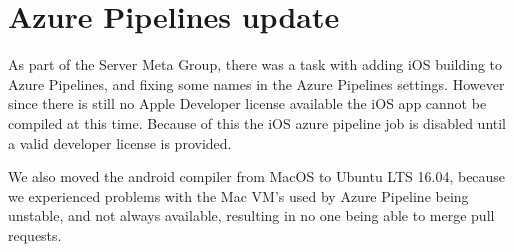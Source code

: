 \section{Azure Pipelines update}
As part of the Server Meta Group, there was a task with adding iOS building to Azure Pipelines, and fixing some names in the Azure Pipelines settings. However since there is still no Apple Developer license available the iOS app cannot be compiled at this time. Because of this the iOS azure pipeline job is disabled until a valid developer license is provided. 

We also moved the android compiler from MacOS to Ubuntu LTS 16.04, because we experienced problems with the Mac VM's used by Azure Pipeline being unstable, and not always available, resulting in no one being able to merge pull requests.

